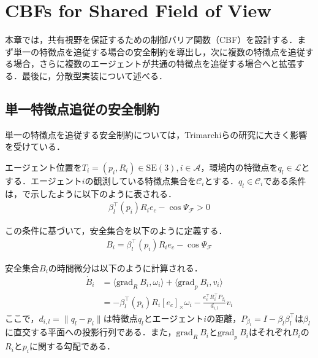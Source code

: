 \section{CBFs for Shared Field of View}

本章では，共有視野を保証するための制御バリア関数（CBF）を設計する．まず単一の特徴点を追従する場合の安全制約を導出し，次に複数の特徴点を追従する場合，さらに複数のエージェントが共通の特徴点を追従する場合へと拡張する．最後に，分散型実装について述べる．

\subsection{単一特徴点追従の安全制約}

単一の特徴点を追従する安全制約については，Trimarchiら\cite{Trimarchi2025}の研究に大きく影響を受けている．

エージェント位置を$T_i=(p_i, R_i)\in \mathrm{SE}(3), i\in\mathcal{A}$，環境内の特徴点を$q_l\in \mathcal{L}$とする．エージェント$i$の観測している特徴点集合を$\mathcal{C}_i$とする．$q_l\in\mathcal{C}_i$である条件は，で示したように以下のように表される．
\begin{equation}
\begin{aligned}
\beta_l^{\top}(p_i)R_ie_c-\cos\Psi_\mathcal{F}>0
\label{eq:fov_condition_single}
\end{aligned}
\end{equation}

この条件に基づいて，安全集合を以下のように定義する．
\begin{equation}
\begin{aligned}
B_{i} = \beta_l^{\top}(p_i)R_ie_c-\cos\Psi_\mathcal{F}
\label{eq:safe_set_single}
\end{aligned}
\end{equation}

安全集合$B_i$の時間微分は以下のように計算される．
\begin{equation}
\begin{aligned}
\dot{B}_{i} &= \langle \mathrm{grad}_R\:B_i,\omega_i\rangle + \langle \mathrm{grad}_p\:B_i,v_i\rangle \\
&= -\beta_l^\top(p_i) R_i [e_c]_\times\omega_i - \frac{e_c^\top R_i^\top P_{\beta_l}}{d_{i,l}}v_i
\label{eq:safe_set_derivative_single}
\end{aligned}
\end{equation}
ここで，$d_{i,l}={\|q_l-p_i\|}$は特徴点$q_l$とエージェント$i$の距離，$P_{\beta_l} = I-\beta_l\beta_l^\top$は$\beta_l$に直交する平面への投影行列である．また，$\mathrm{grad}_R\:B_i$と$\mathrm{grad}_p\:B_i$はそれぞれ$B_i$の$R_i$と$p_i$に関する勾配である．

